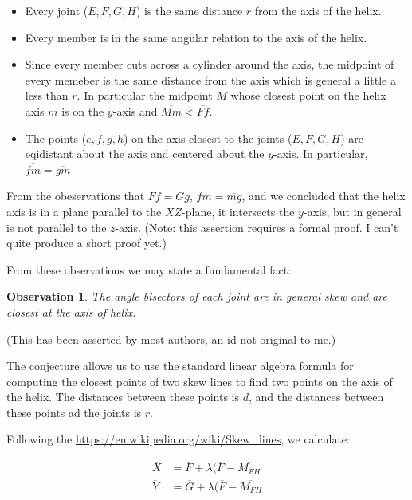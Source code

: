 \documentclass[11pt]{article}
\newtheorem{observation}{Observation}
\begin{document}
{\begin{itemize}
\item Every joint ($E,F,G,H$) is the same distance $r$ from the axis of the helix.
\item Every member is in the same angular relation to the axis of the helix.
\item Since every member cuts across a cylinder around the axis,
  the midpoint of every memeber is the same distance from the axis
  which is general a little a less than $r$. In particular the midpoint $M$
  whose closest point on the helix axis $m$ is on the $y$-axis and
  $\overline{Mm} < \overline{Ff}$.
\item The points ($e,f,g,h$) on the axis closest to the joints ($E,F,G,H$)
  are eqidistant about the axis and centered about the $y$-axis. In
  particular, $\overline{fm} = \overline{gm}$
\end{itemize}

From the obeservations that $\overline{Ff} = \overline{Gg}$,
$\overline{fm} = \overline{mg} $, and
 we concluded that the helix axis is in a plane
parallel to the $XZ$-plane, it intersects the $y$-axis, but in general is
not parallel to the $z$-axis. (Note: this assertion requires a formal proof. I can't quite produce a short proof yet.)

From these observations we may state a fundamental fact:

\begin{observation}
  The angle bisectors of each joint are in general skew and are closest
  at the axis of helix.
\end{observation}

(This has been asserted by most authors, an id not original to me.)

The conjecture allows us to use the standard linear algebra formula for
computing the closest points of two skew lines to find two points on the
axis of the helix. The distances between these points is $d$, and the
distances between these points ad the joints is $r$.

Following the \url{https://en.wikipedia.org/wiki/Skew_lines}, we calculate:

\begin{align}
  \overline{X} &= \overline{F} + \lambda(\overline{F} - \overline{M_{FH}} \\
  \overline{Y} &= \overline{G} + \lambda(\overline{F} - \overline{M_{FH}}  
\end{align}

}
\end{document}
